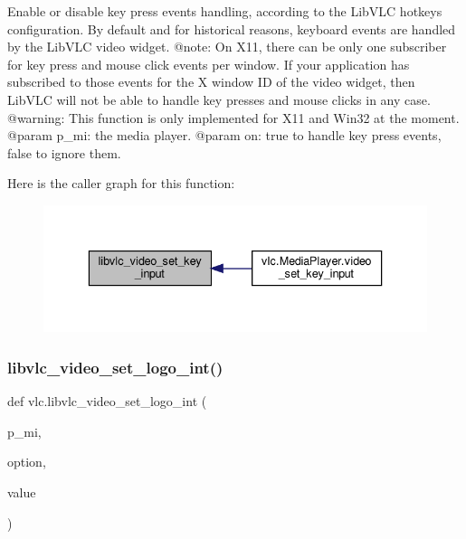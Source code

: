 \begin{DoxyVerb}Enable or disable key press events handling, according to the LibVLC hotkeys
configuration. By default and for historical reasons, keyboard events are
handled by the LibVLC video widget.
@note: On X11, there can be only one subscriber for key press and mouse
click events per window. If your application has subscribed to those events
for the X window ID of the video widget, then LibVLC will not be able to
handle key presses and mouse clicks in any case.
@warning: This function is only implemented for X11 and Win32 at the moment.
@param p_mi: the media player.
@param on: true to handle key press events, false to ignore them.
\end{DoxyVerb}
 Here is the caller graph for this function\+:
\nopagebreak
\begin{figure}[H]
\begin{center}
\leavevmode
\includegraphics[width=336pt]{namespacevlc_a76625220c6c679321e8b22df8a1070d1_icgraph}
\end{center}
\end{figure}
\mbox{\label{namespacevlc_a08e6d3ec08615034c79b7692c3048aa5}} 
\subsubsection{\texorpdfstring{libvlc\+\_\+video\+\_\+set\+\_\+logo\+\_\+int()}{libvlc\_video\_set\_logo\_int()}}
{\footnotesize\ttfamily def vlc.\+libvlc\+\_\+video\+\_\+set\+\_\+logo\+\_\+int (\begin{DoxyParamCaption}\item[{}]{p\+\_\+mi,  }\item[{}]{option,  }\item[{}]{value }\end{DoxyParamCaption})}

